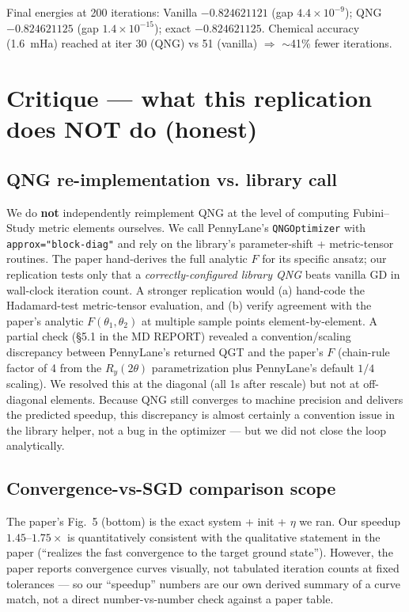 \documentclass[11pt]{article}
\begin{document}
Final energies at 200 iterations:
Vanilla $-0.824621121$ (gap $4.4\times 10^{-9}$);
QNG $-0.824621125$ (gap $1.4\times 10^{-15}$);
exact $-0.824621125$. Chemical accuracy (1.6~mHa) reached at iter 30 (QNG) vs 51 (vanilla)
$\Rightarrow$ $\sim$41\% fewer iterations.

\section{Critique --- what this replication does NOT do (honest)}
\label{sec:critique}

\subsection{QNG re-implementation vs. library call}
We do \textbf{not} independently reimplement QNG at the level of computing Fubini--Study
metric elements ourselves. We call PennyLane's \texttt{QNGOptimizer} with
\texttt{approx="block-diag"} and rely on the library's parameter-shift + metric-tensor
routines. The paper hand-derives the full analytic $F$ for its specific ansatz; our replication
tests only that a \emph{correctly-configured library QNG} beats vanilla GD in wall-clock iteration
count. A stronger replication would (a) hand-code the Hadamard-test metric-tensor evaluation, and
(b) verify agreement with the paper's analytic $F(\theta_1,\theta_2)$ at multiple sample points
element-by-element. A partial check (§5.1 in the MD REPORT) revealed a convention/scaling
discrepancy between PennyLane's returned QGT and the paper's $F$ (chain-rule factor of 4 from the
$R_y(2\theta)$ parametrization plus PennyLane's default $1/4$ scaling). We resolved this at the
diagonal (all 1s after rescale) but not at off-diagonal elements. Because QNG still converges
to machine precision and delivers the predicted speedup, this discrepancy is almost certainly a
convention issue in the library helper, not a bug in the optimizer --- but we did not close the
loop analytically.

\subsection{Convergence-vs-SGD comparison scope}
The paper's Fig.~5 (bottom) is the exact system + init + $\eta$ we ran. Our speedup
$1.45$--$1.75\times$ is quantitatively consistent with the qualitative statement in the paper
(``realizes the fast convergence to the target ground state''). However, the paper reports
convergence curves visually, not tabulated iteration counts at fixed tolerances --- so our
``speedup'' numbers are our own derived summary of a curve match, not a direct number-vs-number
check against a paper table.
\end{document}

